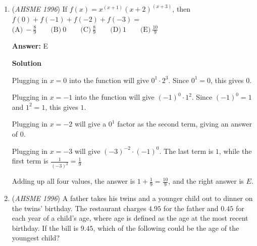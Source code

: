 \begin{enumerate}
 $\text{(A)}\  \frac{1+2}{3+4} \qquad\text{(B)}\ \frac{1+4}{2+3} \qquad\text{(C)}\  \frac{2+3}{1+4} \qquad\text{(D)}\  \frac{2+4}{1+3} \qquad\text{(E)}\ \frac{3+4}{1+2}$

 Simplified, the options are $\frac{3}{7}, 1, 1, \frac{3}{2}, \frac{7}{3}$, respectively.  Since $\frac{7}{3}$ is the only option that is greater than $2$, the answer is $\boxed{E}$.

 



\textbf{Solution 2}

To make a fraction large, you want the largest possible numerator, and the smallest possible denominator.  Since $c$ and $d$ are the two largest numbers, they should go in the numerator as a sum.  Since $a$ and $b$ are the smallest numbers, they should go in the denominator as a sum.  Thus, the answer is $\boxed{E}$.

 You can compare option $E$ with every other fraction:  all numerators are smaller than $E$'s numerator, and all denominators are larger than $E$'s denominator.

 


	\item (\textit{AHSME 1996}) If $f(x) = x^{(x+1)}(x+2)^{(x+3)}$, then $f(0)+f(-1)+f(-2)+f(-3) =$
$\text{(A)}\ -\frac{8}{9}\qquad\text{(B)}\ 0\qquad\text{(C)}\ \frac{8}{9}\qquad\text{(D)}\ 1\qquad\text{(E)}\ \frac{10}{9}$

 \textbf{Answer: }E



\textbf{Solution}

Plugging in $x=0$ into the function will give $0^1\cdot 2^3$.  Since $0^1 = 0$, this gives $0$.

 Plugging in $x=-1$ into the function will give $(-1)^0 \cdot 1^2$.  Since $(-1)^0 = 1$ and $1^2 = 1$, this gives $1$.

 Plugging in $x=-2$ will give a $0^1$ factor as the second term, giving an answer of $0$.

 Plugging in $x=-3$ will give $(-3)^{-2}\cdot (-1)^0$.  The last term is $1$, while the first term is $\frac{1}{(-3)^2} = \frac{1}{9}$

 Adding up all four values, the answer is $1 + \frac{1}{9} = \frac{10}{9}$, and the right answer is $\boxed{E}$.

 


	\item (\textit{AHSME 1996}) A father takes his twins and a younger child out to dinner on the twins' birthday. The restaurant charges $4.95$ for the father and $0.45$ for each year of a child's age, where age is defined as the age at the most recent birthday. If the bill is $9.45$, which of the following could be the age of the youngest child? 



\end{enumerate}

